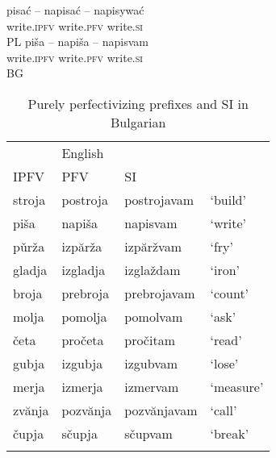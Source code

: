 \documentclass[output=paper,colorlinks,citecolor=brown]{langscibook}
\begin{document}
\ea\label{basics:pl-bg-distinction}	
\ea \gll pisać – napisać -- \minsp{*} napisywać \label{basics:pl:triplet:impossible}\\ \hfill 
 write.\textsc{ipfv}  {} write.\textsc{pfv} {} {} write.\textsc{si} \\\hfill PL 
\ex  \gll piša – napiša -- napisvam \label{basics:bg:triplet:possible} \\
 write.\textsc{ipfv}  {} write.\textsc{pfv} {} write.\textsc{si}\\\hfill BG
 \z
 \z 
\begin{table}
\begin{tabularx}{.8\textwidth}{XXll}
\lsptoprule
\multicolumn{3}{c}{Bulgarian} & {English}\\
\cmidrule{1-3}
%
IPFV & PFV & SI \\ 

\midrule
 stroja & postroja & \cellcolor{gray!15} postrojavam & `build'\\
 piša & napiša & \cellcolor{gray!15} napisvam & `write’ \\ p\v{u}r\v{z}a & izpăr\v{z}a & \cellcolor{gray!15} izpăr\v{z}vam & `fry'\\ gladja & izgladja & \cellcolor{gray!15} izgla\v{z}dam & `iron' \\ broja & prebroja & \cellcolor{gray!15} prebrojavam & `count'\\  molja & pomolja & \cellcolor{gray!15} pomolvam & `ask'\\ četa & pročeta & \cellcolor{gray!15} pročitam & `read' \\gubja & izgubja & \cellcolor{gray!15} izgubvam & `lose' \\ merja & izmerja & \cellcolor{gray!15} izmervam & `measure' \\ zvănja & pozvănja & \cellcolor{gray!15} pozvănjavam & `call'\\ čupja & sčupja & \cellcolor{gray!15} sčupvam & `break' \\
\lspbottomrule
\end{tabularx}
\caption{Purely perfectivizing prefixes and SI in Bulgarian}
\label{table:pure:longBG}
\end{table}
\end{document}
